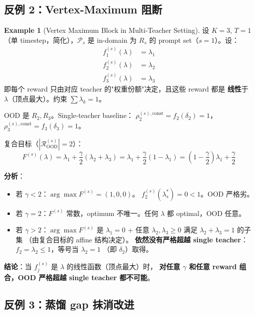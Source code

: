 \documentclass[11pt,a4paper]{article}
\newcommand{\OOD}{\mathrm{OOD}}
\newcommand{\const}{\mathrm{const}}
\theoremstyle{definition}
\newtheorem{example}{Example}
\begin{document}
\subsection{反例 2：Vertex-Maximum 阻断}
\label{subsec:counter2}

\begin{example}[Vertex Maximum Block in Multi-Teacher Setting]
\label{ex:vertex}
设 $K = 3$, $T = 1$（单 timestep，简化），$\mathcal{P}_s$ 是 in-domain 为
$R_s$ 的 prompt set（$s = 1$）。设：
\begin{align}
f_1^{(s)}(\lambda) &= \lambda_1 \\
f_2^{(s)}(\lambda) &= \lambda_2 \\
f_3^{(s)}(\lambda) &= \lambda_3
\end{align}
即每个 reward 只由对应 teacher 的"权重份额"决定，且这些 reward 都是
\textbf{线性}于 $\lambda$（顶点最大）。约束 $\sum \lambda_k = 1$。

OOD 是 $R_2, R_3$。Single-teacher baseline：
$\rho_2^{(s),\const} = f_2(\delta_2) = 1$，$\rho_3^{(s),\const} = f_3(\delta_3) = 1$。

复合目标（$|\mathcal{R}_{\OOD}^{(s)}| = 2$）：
\begin{equation}
F^{(s)}(\lambda) = \lambda_1 + \frac{\gamma}{2}(\lambda_2 + \lambda_3)
= \lambda_1 + \frac{\gamma}{2}(1 - \lambda_1)
= \left(1 - \frac{\gamma}{2}\right)\lambda_1 + \frac{\gamma}{2}
\end{equation}

\textbf{分析}：
\begin{itemize}[leftmargin=1.5em]
\item 若 $\gamma < 2$：$\arg\max F^{(s)} = (1, 0, 0)$。
$f_2^{(s)}(\lambda_s^*) = 0 < 1$。OOD 严格劣。
\item 若 $\gamma = 2$：$F^{(s)}$ 常数，optimum 不唯一。任何 $\lambda$ 都
optimal，OOD 任意。
\item 若 $\gamma > 2$：$\arg\max F^{(s)}$ 是 $\lambda_1 = 0$ + 任意
$\lambda_2, \lambda_3 \geq 0$ 满足 $\lambda_2 + \lambda_3 = 1$ 的子集
（由复合目标的 affine 结构决定）。
\textbf{依然没有严格超越 single teacher}：$f_2 = \lambda_2 \leq 1$，等号当 $\lambda_2 = 1$
（即 $\delta_2$）取得。
\end{itemize}

\textbf{结论}：当 $f_j^{(s)}$ 是 $\lambda$ 的线性函数（顶点最大）时，
\textbf{对任意 $\gamma$ 和任意 reward 组合，OOD 严格超越 single teacher 都不可能}。
\end{example}

\subsection{反例 3：蒸馏 gap 抹消改进}
\label{subsec:counter3}
\end{document}
